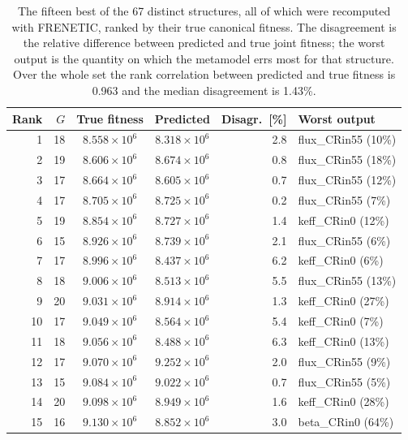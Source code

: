 \begin{table}[htbp]
\centering
\caption{The fifteen best of the 67 distinct structures, all of which were
recomputed with FRENETIC, ranked by their true canonical fitness. The
disagreement is the relative difference between predicted and true joint
fitness; the worst output is the quantity on which the metamodel errs most for
that structure. Over the whole set the rank correlation between predicted and
true fitness is 0.963 and the median disagreement is 1.43\%.}
\label{tab:ranking}
\begin{tabular}{|r|r|c|c|r|l|}
\hline
Rank & $G$ & True fitness & Predicted & Disagr.\ [\%] & Worst output \\ \hline
    1 & 18 & $8.558\times10^{6}$ & $8.318\times10^{6}$ & 2.8 & flux\_CRin55 (10\%) \\
    2 & 19 & $8.606\times10^{6}$ & $8.674\times10^{6}$ & 0.8 & flux\_CRin55 (18\%) \\
    3 & 17 & $8.664\times10^{6}$ & $8.605\times10^{6}$ & 0.7 & flux\_CRin55 (12\%) \\
    4 & 17 & $8.705\times10^{6}$ & $8.725\times10^{6}$ & 0.2 & flux\_CRin55 (7\%) \\
    5 & 19 & $8.854\times10^{6}$ & $8.727\times10^{6}$ & 1.4 & keff\_CRin0 (12\%) \\
    6 & 15 & $8.926\times10^{6}$ & $8.739\times10^{6}$ & 2.1 & flux\_CRin55 (6\%) \\
    7 & 17 & $8.996\times10^{6}$ & $8.437\times10^{6}$ & 6.2 & keff\_CRin0 (6\%) \\
    8 & 18 & $9.006\times10^{6}$ & $8.513\times10^{6}$ & 5.5 & flux\_CRin55 (13\%) \\
    9 & 20 & $9.031\times10^{6}$ & $8.914\times10^{6}$ & 1.3 & keff\_CRin0 (27\%) \\
    10 & 17 & $9.049\times10^{6}$ & $8.564\times10^{6}$ & 5.4 & keff\_CRin0 (7\%) \\
    11 & 18 & $9.056\times10^{6}$ & $8.488\times10^{6}$ & 6.3 & keff\_CRin0 (13\%) \\
    12 & 17 & $9.070\times10^{6}$ & $9.252\times10^{6}$ & 2.0 & flux\_CRin55 (9\%) \\
    13 & 15 & $9.084\times10^{6}$ & $9.022\times10^{6}$ & 0.7 & flux\_CRin55 (5\%) \\
    14 & 20 & $9.098\times10^{6}$ & $8.949\times10^{6}$ & 1.6 & keff\_CRin0 (28\%) \\
    15 & 16 & $9.130\times10^{6}$ & $8.852\times10^{6}$ & 3.0 & beta\_CRin0 (64\%) \\
\hline
\end{tabular}
\end{table}